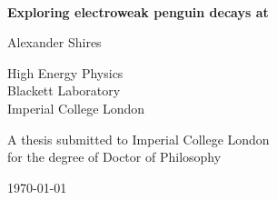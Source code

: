 \begin{titlepage}

~
\vspace{2.5cm}


\begin{center}
{\huge \bf \boldmath
Exploring \bquark\to\squark electroweak penguin decays at \lhcb
}
\end{center}

\vspace{2.5cm}

\begin{center}

{\large
Alexander Shires \\
}

\vspace{0.5cm}

High Energy Physics \\
Blackett Laboratory \\
Imperial College London \\

\end{center}

\vfill

\begin{center}

A thesis submitted to Imperial College London \\
for the degree of Doctor of Philosophy \\

\vspace{0.5cm}

\today

\end{center}

\end{titlepage}

